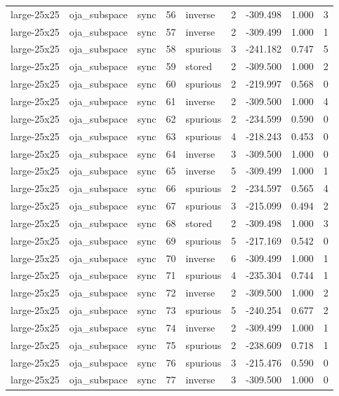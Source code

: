 \begin{tabular}{lllrlrrrr}
large-25x25 & oja\_subspace & sync & 56 & inverse & 2 & -309.498 & 1.000 & 3 \\
large-25x25 & oja\_subspace & sync & 57 & inverse & 2 & -309.499 & 1.000 & 1 \\
large-25x25 & oja\_subspace & sync & 58 & spurious & 3 & -241.182 & 0.747 & 5 \\
large-25x25 & oja\_subspace & sync & 59 & stored & 2 & -309.500 & 1.000 & 2 \\
large-25x25 & oja\_subspace & sync & 60 & spurious & 2 & -219.997 & 0.568 & 0 \\
large-25x25 & oja\_subspace & sync & 61 & inverse & 2 & -309.500 & 1.000 & 4 \\
large-25x25 & oja\_subspace & sync & 62 & spurious & 2 & -234.599 & 0.590 & 0 \\
large-25x25 & oja\_subspace & sync & 63 & spurious & 4 & -218.243 & 0.453 & 0 \\
large-25x25 & oja\_subspace & sync & 64 & inverse & 3 & -309.500 & 1.000 & 0 \\
large-25x25 & oja\_subspace & sync & 65 & inverse & 5 & -309.499 & 1.000 & 1 \\
large-25x25 & oja\_subspace & sync & 66 & spurious & 2 & -234.597 & 0.565 & 4 \\
large-25x25 & oja\_subspace & sync & 67 & spurious & 3 & -215.099 & 0.494 & 2 \\
large-25x25 & oja\_subspace & sync & 68 & stored & 2 & -309.498 & 1.000 & 3 \\
large-25x25 & oja\_subspace & sync & 69 & spurious & 5 & -217.169 & 0.542 & 0 \\
large-25x25 & oja\_subspace & sync & 70 & inverse & 6 & -309.499 & 1.000 & 1 \\
large-25x25 & oja\_subspace & sync & 71 & spurious & 4 & -235.304 & 0.744 & 1 \\
large-25x25 & oja\_subspace & sync & 72 & inverse & 2 & -309.500 & 1.000 & 2 \\
large-25x25 & oja\_subspace & sync & 73 & spurious & 5 & -240.254 & 0.677 & 2 \\
large-25x25 & oja\_subspace & sync & 74 & inverse & 2 & -309.499 & 1.000 & 1 \\
large-25x25 & oja\_subspace & sync & 75 & spurious & 2 & -238.609 & 0.718 & 1 \\
large-25x25 & oja\_subspace & sync & 76 & spurious & 3 & -215.476 & 0.590 & 0 \\
large-25x25 & oja\_subspace & sync & 77 & inverse & 3 & -309.500 & 1.000 & 0 \\

\end{tabular}
